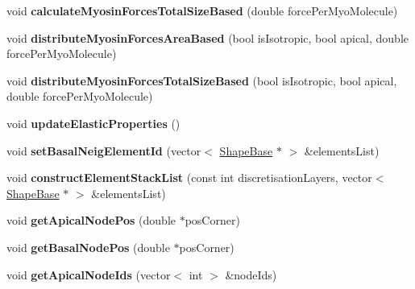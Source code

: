 \begin{DoxyCompactItemize}
\item 
\hypertarget{classPrism_ad722dcddb4c3dbcec9871dcbebb74ff4}{}void {\bfseries calculate\+Myosin\+Forces\+Total\+Size\+Based} (double force\+Per\+Myo\+Molecule)\label{classPrism_ad722dcddb4c3dbcec9871dcbebb74ff4}

\item 
\hypertarget{classPrism_a3f50082590bbdd4181b9d018ff59fa5d}{}void {\bfseries distribute\+Myosin\+Forces\+Area\+Based} (bool is\+Isotropic, bool apical, double force\+Per\+Myo\+Molecule)\label{classPrism_a3f50082590bbdd4181b9d018ff59fa5d}

\item 
\hypertarget{classPrism_a3dac7ea4eea1289c8497ada2b3fd3443}{}void {\bfseries distribute\+Myosin\+Forces\+Total\+Size\+Based} (bool is\+Isotropic, bool apical, double force\+Per\+Myo\+Molecule)\label{classPrism_a3dac7ea4eea1289c8497ada2b3fd3443}

\item 
\hypertarget{classPrism_ace69b0f46bcd14fed2413fa2e24701e4}{}void {\bfseries update\+Elastic\+Properties} ()\label{classPrism_ace69b0f46bcd14fed2413fa2e24701e4}

\item 
\hypertarget{classPrism_ab2cc025be211e234a20c71c1cb12044a}{}void {\bfseries set\+Basal\+Neig\+Element\+Id} (vector$<$ \hyperlink{classShapeBase}{Shape\+Base} $\ast$ $>$ \&elements\+List)\label{classPrism_ab2cc025be211e234a20c71c1cb12044a}

\item 
\hypertarget{classPrism_a2617454fb5ce1f2e5a6496436a7798eb}{}void {\bfseries construct\+Element\+Stack\+List} (const int discretisation\+Layers, vector$<$ \hyperlink{classShapeBase}{Shape\+Base} $\ast$ $>$ \&elements\+List)\label{classPrism_a2617454fb5ce1f2e5a6496436a7798eb}

\item 
\hypertarget{classPrism_a243934a73a8f198ed592761ecb0927b9}{}void {\bfseries get\+Apical\+Node\+Pos} (double $\ast$pos\+Corner)\label{classPrism_a243934a73a8f198ed592761ecb0927b9}

\item 
\hypertarget{classPrism_a31324d23b37fa20911916ebb7ee1064d}{}void {\bfseries get\+Basal\+Node\+Pos} (double $\ast$pos\+Corner)\label{classPrism_a31324d23b37fa20911916ebb7ee1064d}

\item 
\hypertarget{classPrism_a183639a3a651e9d2ab4b15993c21fe59}{}void {\bfseries get\+Apical\+Node\+Ids} (vector$<$ int $>$ \&node\+Ids)\label{classPrism_a183639a3a651e9d2ab4b15993c21fe59}


\end{DoxyCompactItemize}

